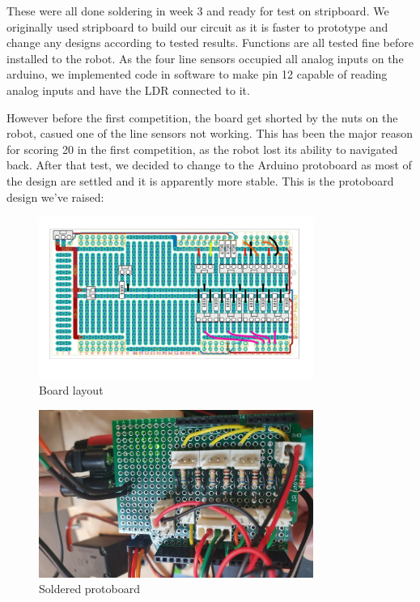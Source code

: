 \documentclass{article}
\begin{document}
\quad These were all done soldering in week 3 and ready for test on stripboard. We originally used stripboard to build our circuit as it is faster to prototype and change any designs according to tested results. Functions are all tested fine before installed to the robot. As the four line sensors occupied all analog inputs on the arduino, we implemented code in software to make pin 12 capable of  reading analog inputs and have the LDR connected to it.

\quad However before the first competition, the board get shorted by the nuts on the robot, casued one of the line sensors not working. This has been the major reason for scoring 20 in the first competition, as the robot lost its ability to navigated back. After that test, we decided to change to the Arduino protoboard as most of the design are settled and it is apparently more stable. This is the protoboard design we’ve raised:

\begin{figure}[!h]
    \centering
    \includegraphics[width=0.8\textwidth]{assets/Proto.png}
    \caption{Board layout}
    \label{fig:board_layout}
\end{figure} 

\begin{figure}[!h]
    \centering
    \includegraphics[width=0.8\textwidth]{assets/Board.png}
    \caption{Soldered protoboard}
    \label{fig:final_board}
\end{figure} 
\end{document}
